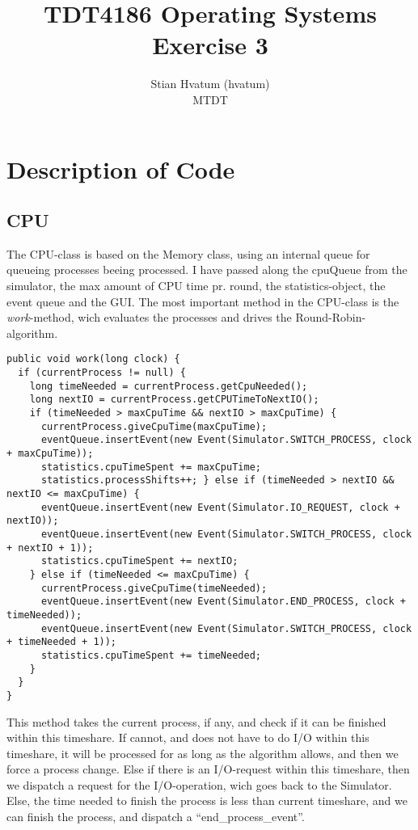 \documentclass[norsk,a4paper]{article}
\title{TDT4186 Operating Systems\\
{\Huge Exercise 3}}
\author{Stian Hvatum (hvatum)\\MTDT}
\begin{document}
\maketitle
\thispagestyle{empty}
\newpage
{}
\tableofcontents
\newpage
{}
\section{Description of Code}
\subsection{CPU}
The CPU-class is based on the Memory class, using an internal queue for
queueing processes beeing processed. I have passed along the cpuQueue from the
simulator, the max amount of CPU time pr. round, the statistics-object, the
event queue and the GUI. The most important method in the CPU-class is the
\emph{work}-method, wich evaluates the processes and drives the
Round-Robin-algorithm.
\lstset{language=java}
\begin{lstlisting}
public void work(long clock) {
  if (currentProcess != null) {
    long timeNeeded = currentProcess.getCpuNeeded();
    long nextIO = currentProcess.getCPUTimeToNextIO();
    if (timeNeeded > maxCpuTime && nextIO > maxCpuTime) {
      currentProcess.giveCpuTime(maxCpuTime);
      eventQueue.insertEvent(new Event(Simulator.SWITCH_PROCESS, clock + maxCpuTime));
      statistics.cpuTimeSpent += maxCpuTime;
      statistics.processShifts++; } else if (timeNeeded > nextIO && nextIO <= maxCpuTime) {
      eventQueue.insertEvent(new Event(Simulator.IO_REQUEST, clock + nextIO));
      eventQueue.insertEvent(new Event(Simulator.SWITCH_PROCESS, clock + nextIO + 1));
      statistics.cpuTimeSpent += nextIO;
    } else if (timeNeeded <= maxCpuTime) {
      currentProcess.giveCpuTime(timeNeeded);
      eventQueue.insertEvent(new Event(Simulator.END_PROCESS, clock + timeNeeded));
      eventQueue.insertEvent(new Event(Simulator.SWITCH_PROCESS, clock + timeNeeded + 1));
      statistics.cpuTimeSpent += timeNeeded;
    }
  }
}
\end{lstlisting}
This method takes the current process, if any, and check if it can be finished
within this timeshare. If cannot, and does not have to do I/O within this
timeshare, it will be processed for as long as the algorithm allows, and then we
force a process change. Else if there is an I/O-request within this timeshare,
then we dispatch a request for the I/O-operation, wich goes back to the
Simulator. Else, the time needed to finish the process is less than current
timeshare, and we can finish the process, and dispatch a
``end\_process\_event''.
\end{document}
